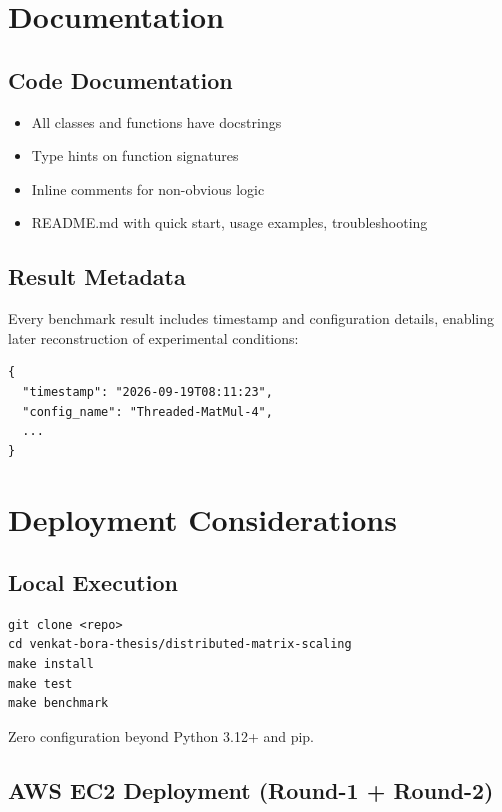 \section{Documentation}

\subsection{Code Documentation}

\begin{itemize}
    \item All classes and functions have docstrings
    \item Type hints on function signatures
    \item Inline comments for non-obvious logic
    \item README.md with quick start, usage examples, troubleshooting
\end{itemize}

\subsection{Result Metadata}

Every benchmark result includes timestamp and configuration details, enabling later reconstruction of experimental conditions:

\begin{verbatim}
{
  "timestamp": "2026-09-19T08:11:23",
  "config_name": "Threaded-MatMul-4",
  ...
}
\end{verbatim}

\section{Deployment Considerations}

\subsection{Local Execution}

\begin{verbatim}
git clone <repo>
cd venkat-bora-thesis/distributed-matrix-scaling
make install
make test
make benchmark
\end{verbatim}

Zero configuration beyond Python 3.12+ and pip.

\subsection{AWS EC2 Deployment (Round-1 + Round-2)}

